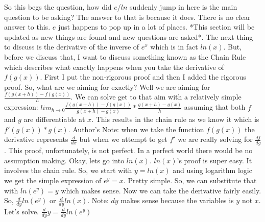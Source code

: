 \documentclass{article}
\begin{document}
\newline
\newline
So this begs the question, how did $e$/$ln$ suddenly jump in here is the main question to be asking? The answer to that is because it does. There is no clear answer to this. $e$ just happens to pop up in a lot of places. *This section will be updated as new things are found and new questions are asked*.
\newline
\newline
The next thing to discuss is the derivative of the inverse of $e^x$ which is in fact $ln(x)$. But, before we discuss that, I want to discuss something known as the Chain Rule which describes what exactly happens when you take the derivative of $f(g(x))$. First I put the non-rigorous proof and then I added the rigorous proof.
\newline
\newline
So, what are we aiming for exactly? Well we are aiming for $\frac{f(g(x+h)) - f(g(x))}{h}$. 
\newline
\newline
We can solve get to that aim with a relatively simple expression: $lim_{h \to 0} \frac{f(g(x+h)) - f(g(x))}{g(x+h)-g(x)} * \frac{g(x+h)-g(x)}{h}$ assuming that both $f$ and $g$ are differentiable at $x$. This results in the chain rule as we know it which is $f'(g(x)) * g(x)$.
\newline
\newline
Author's Note: when we take the function $f(g(x))$ the derivative represents $\frac{d}{dx}$ but when we attempt to get $f'$ we are really solving for $\frac{df}{dg}$. This proof, unfortunately, is not perfect. In a perfect world there would be no assumption making. 
\newline
\newline
Okay, lets go into $ln(x)$. $ln(x)$'s proof is super easy. It involves the chain rule.
\newline
\newline
So, we start with $y = ln(x)$ and using logarithm logic we get the simple expression of $e^y = x$. Pretty simple. So, we can substitute that with $ln(e^y) = y$ which makes sense. Now we can take the derivative fairly easily. So, $\frac{d}{dy} ln(e^y)$ or $\frac{d}{dy} ln(x)$. Note: $dy$ makes sense because the variables is $y$ not $x$. Let's solve.
\newline
\newline
$\frac{d}{dy} y = \frac{d}{dy} ln(e^y)$
\newline
\newline
\end{document}
